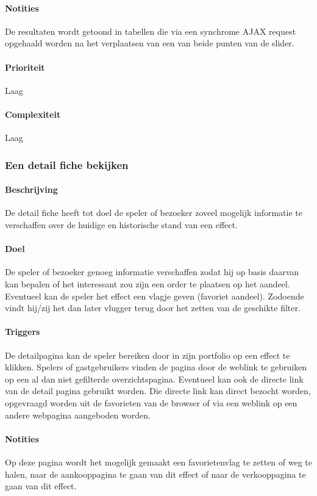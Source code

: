 \paragraph{Notities} De resultaten wordt getoond in tabellen die via een synchrome AJAX request opgehaald worden na het verplaatsen van een van beide punten van de slider.
\paragraph{Prioriteit}Laag
\paragraph{Complexiteit}Laag

\subsubsection{Een detail fiche bekijken}
\paragraph{Beschrijving} De detail fiche heeft tot doel de speler of bezoeker zoveel mogelijk informatie te verschaffen over de huidige en historische stand van een effect.
\paragraph{Doel} De speler of bezoeker genoeg informatie verschaffen zodat hij op basis daarvan kan bepalen of het interessant zou zijn een order te plaatsen op het aandeel. Eventueel kan de speler het effect een vlagje geven (favoriet aandeel). Zodoende vindt hij/zij het dan later vlugger terug door het zetten van de geschikte filter.
\paragraph{Triggers} De detailpagina kan de speler bereiken door in zijn portfolio op een effect te klikken. Spelers of gastgebruikers vinden de pagina door de weblink te gebruiken op een al dan niet gefilterde overzichtspagina. Eventueel kan ook de directe link van de detail pagina gebruikt worden. Die directe link kan direct bezocht worden, opgevraagd worden uit de favorieten van de browser of via een weblink op een andere webpagina aangeboden worden.
\paragraph{Notities} Op deze pagina wordt het mogelijk gemaakt een favorietenvlag te zetten of weg te halen, naar de aankooppagina te gaan van dit effect of naar de verkooppagina te gaan van dit effect.
